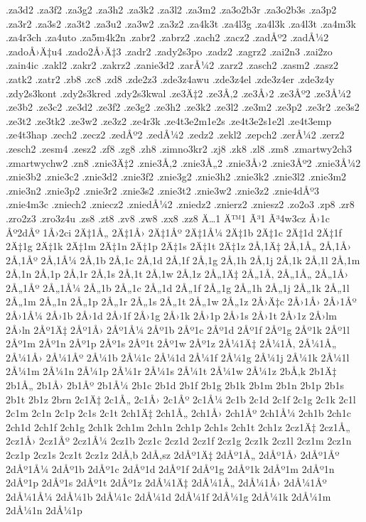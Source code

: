 {.za3d2
.za3f2
.za3g2
.za3h2
.za3k2
.za3l2
.za3m2
.za3o2b3r
.za3o2b3s
.za3p2
.za3r2
.za3s2
.za3t2
.za3u2
.za3w2
.za3z2
.za4k3t
.za4l3g
.za4l3k
.za4l3t
.za4m3k
.za4r3ch
.za4uto
.za5m4k2n
.zabr2
.zabrz2
.zach2
.zacz2
.zadÅº2
.zadÅ¼2
.zadoÅ›Ä‡u4
.zado2Å›Ä‡3
.zadr2
.zady2s3po
.zadz2
.zagrz2
.zai2n3
.zai2zo
.zain4ic
.zakl2
.zakr2
.zakrz2
.zanie3d2
.zarÅ¼2
.zarz2
.zasch2
.zasm2
.zasz2
.zatk2
.zatr2
.zb8
.zc8
.zd8
.zde2z3
.zde3z4awu
.zde3z4el
.zde3z4er
.zde3z4y
.zdy2s3kont
.zdy2s3kred
.zdy2s3kwal
.ze3Ä‡2
.ze3Å‚2
.ze3Å›2
.ze3Åº2
.ze3Å¼2
.ze3b2
.ze3c2
.ze3d2
.ze3f2
.ze3g2
.ze3h2
.ze3k2
.ze3l2
.ze3m2
.ze3p2
.ze3r2
.ze3s2
.ze3t2
.ze3tk2
.ze3w2
.ze3z2
.ze4r3k
.ze4t3e2m1e2s
.ze4t3e2s1e2l
.ze4t3emp
.ze4t3hap
.zech2
.zecz2
.zedÅº2
.zedÅ¼2
.zedz2
.zekl2
.zepch2
.zerÅ¼2
.zerz2
.zesch2
.zesm4
.zesz2
.zf8
.zg8
.zh8
.zimno3kr2
.zj8
.zk8
.zl8
.zm8
.zmartwy2ch3
.zmartwychw2
.zn8
.znie3Ä‡2
.znie3Å‚2
.znie3Å„2
.znie3Å›2
.znie3Åº2
.znie3Å¼2
.znie3b2
.znie3c2
.znie3d2
.znie3f2
.znie3g2
.znie3h2
.znie3k2
.znie3l2
.znie3m2
.znie3n2
.znie3p2
.znie3r2
.znie3s2
.znie3t2
.znie3w2
.znie3z2
.znie4dÅº3
.znie4m3c
.zniech2
.zniecz2
.zniedÅ¼2
.zniedz2
.znierz2
.zniesz2
.zo2o3
.zp8
.zr8
.zro2z3
.zro3z4u
.zs8
.zt8
.zv8
.zw8
.zx8
.zz8
Ä…1
Ä™1
Ã³1
Ã³4w3cz
Å›1c
Åº2dÅº
1Å›2ci
2Ä‡1Å„
2Ä‡1Å›
2Ä‡1Åº
2Ä‡1Å¼
2Ä‡1b
2Ä‡1c
2Ä‡1d
2Ä‡1f
2Ä‡1g
2Ä‡1k
2Ä‡1m
2Ä‡1n
2Ä‡1p
2Ä‡1s
2Ä‡1t
2Ä‡1z
2Å‚1Ä‡
2Å‚1Å„
2Å‚1Å›
2Å‚1Åº
2Å‚1Å¼
2Å‚1b
2Å‚1c
2Å‚1d
2Å‚1f
2Å‚1g
2Å‚1h
2Å‚1j
2Å‚1k
2Å‚1l
2Å‚1m
2Å‚1n
2Å‚1p
2Å‚1r
2Å‚1s
2Å‚1t
2Å‚1w
2Å‚1z
2Å„1Ä‡
2Å„1Å‚
2Å„1Å„
2Å„1Å›
2Å„1Åº
2Å„1Å¼
2Å„1b
2Å„1c
2Å„1d
2Å„1f
2Å„1g
2Å„1h
2Å„1j
2Å„1k
2Å„1l
2Å„1m
2Å„1n
2Å„1p
2Å„1r
2Å„1s
2Å„1t
2Å„1w
2Å„1z
2Å›Ä‡c
2Å›1Å›
2Å›1Åº
2Å›1Å¼
2Å›1b
2Å›1d
2Å›1f
2Å›1g
2Å›1k
2Å›1p
2Å›1s
2Å›1t
2Å›1z
2Å›lm
2Å›ln
2Åº1Ä‡
2Åº1Å›
2Åº1Å¼
2Åº1b
2Åº1c
2Åº1d
2Åº1f
2Åº1g
2Åº1k
2Åº1l
2Åº1m
2Åº1n
2Åº1p
2Åº1s
2Åº1t
2Åº1w
2Åº1z
2Å¼1Ä‡
2Å¼1Å‚
2Å¼1Å„
2Å¼1Å›
2Å¼1Åº
2Å¼1b
2Å¼1c
2Å¼1d
2Å¼1f
2Å¼1g
2Å¼1j
2Å¼1k
2Å¼1l
2Å¼1m
2Å¼1n
2Å¼1p
2Å¼1r
2Å¼1s
2Å¼1t
2Å¼1w
2Å¼1z
2bÅ‚k
2b1Ä‡
2b1Å„
2b1Å›
2b1Åº
2b1Å¼
2b1c
2b1d
2b1f
2b1g
2b1k
2b1m
2b1n
2b1p
2b1s
2b1t
2b1z
2brn
2c1Ä‡
2c1Å„
2c1Å›
2c1Åº
2c1Å¼
2c1b
2c1d
2c1f
2c1g
2c1k
2c1l
2c1m
2c1n
2c1p
2c1s
2c1t
2ch1Ä‡
2ch1Å„
2ch1Å›
2ch1Åº
2ch1Å¼
2ch1b
2ch1c
2ch1d
2ch1f
2ch1g
2ch1k
2ch1m
2ch1n
2ch1p
2ch1s
2ch1t
2ch1z
2cz1Ä‡
2cz1Å„
2cz1Å›
2cz1Åº
2cz1Å¼
2cz1b
2cz1c
2cz1d
2cz1f
2cz1g
2cz1k
2cz1l
2cz1m
2cz1n
2cz1p
2cz1s
2cz1t
2cz1z
2dÅ‚b
2dÅ‚sz
2dÅº1Ä‡
2dÅº1Å„
2dÅº1Å›
2dÅº1Åº
2dÅº1Å¼
2dÅº1b
2dÅº1c
2dÅº1d
2dÅº1f
2dÅº1g
2dÅº1k
2dÅº1m
2dÅº1n
2dÅº1p
2dÅº1s
2dÅº1t
2dÅº1z
2dÅ¼1Ä‡
2dÅ¼1Å„
2dÅ¼1Å›
2dÅ¼1Åº
2dÅ¼1Å¼
2dÅ¼1b
2dÅ¼1c
2dÅ¼1d
2dÅ¼1f
2dÅ¼1g
2dÅ¼1k
2dÅ¼1m
2dÅ¼1n
2dÅ¼1p
}
